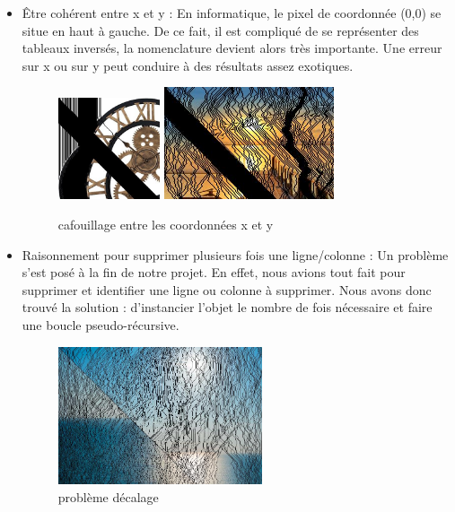 \documentclass[12pt]{article}
\begin{document}
\begin{itemize}
    \item Être cohérent entre x et y : \newline
    En informatique, le pixel de coordonnée (0,0) se situe en haut à gauche. De ce fait, il est compliqué de se représenter des tableaux inversés, la nomenclature devient alors très importante. Une erreur sur x ou sur y peut conduire à des résultats assez exotiques.
        \begin{figure}[h]
	        \begin{center} \includegraphics[width=3cm]{test.jpg}  \includegraphics[width=5cm]{test2.jpg} \end{center}
	        \caption{cafouillage entre les coordonnées x et y}
        \end{figure}
    \newpage
    \item Raisonnement pour supprimer plusieurs fois une ligne/colonne : \newline
    Un problème s'est posé à la fin de notre projet. En effet, nous avions tout fait pour supprimer et identifier une ligne ou colonne à supprimer. Nous avons donc trouvé la solution : d'instancier l'objet le nombre de fois nécessaire et faire une boucle pseudo-récursive.
        \begin{figure}[h]
	        \begin{center} \includegraphics[width=6cm]{test3.jpg} \end{center}
	        \caption{problème décalage}
        \end{figure}
\end{itemize}
\end{document}
